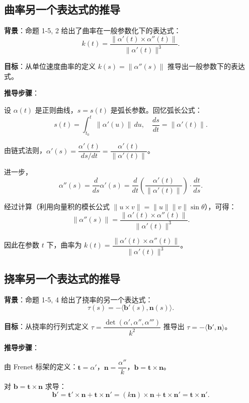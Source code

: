 \subsection*{曲率另一个表达式的推导}\label{sec:appendix-ch1-curvature-alt}

\textbf{背景}：命题 1-5, 2 给出了曲率在一般参数化下的表达式：
\[
k(t) = \frac{\|\alpha'(t) \times \alpha''(t)\|}{\|\alpha'(t)\|^3}.
\]

\textbf{目标}：从单位速度曲率的定义 $k(s) = \|\alpha''(s)\|$ 推导出一般参数下的表达式。

\textbf{推导步骤}：

设 $\alpha(t)$ 是正则曲线，$s = s(t)$ 是弧长参数。回忆弧长公式：
\[
s(t) = \int_{t_0}^t \|\alpha'(u)\| \, du, \quad \frac{ds}{dt} = \|\alpha'(t)\|.
\]

由链式法则，$\alpha'(s) = \dfrac{\alpha'(t)}{ds/dt} = \dfrac{\alpha'(t)}{\|\alpha'(t)\|}$。

进一步，
\[
\alpha''(s) = \frac{d}{ds}\alpha'(s) = \frac{d}{dt}\left(\frac{\alpha'(t)}{\|\alpha'(t)\|}\right) \cdot \frac{dt}{ds}.
\]

经过计算（利用向量积的模长公式 $\|u \times v\| = \|u\|\|v\|\sin\theta$），可得：
\[
\|\alpha''(s)\| = \frac{\|\alpha'(t) \times \alpha''(t)\|}{\|\alpha'(t)\|^3}.
\]

因此在参数 $t$ 下，曲率为 $k(t) = \dfrac{\|\alpha'(t) \times \alpha''(t)\|}{\|\alpha'(t)\|^3}$。

\subsection*{挠率另一个表达式的推导}\label{sec:appendix-ch1-torsion-alt}

\textbf{背景}：命题 1-5, 4 给出了挠率的另一个表达式：
\[
\tau(s) = -\langle \mathbf{b}'(s), \mathbf{n}(s) \rangle.
\]

\textbf{目标}：从挠率的行列式定义 $\tau = \dfrac{\det(\alpha', \alpha'', \alpha''')}{k^2}$ 推导出 $\tau = -\langle \mathbf{b}', \mathbf{n} \rangle$。

\textbf{推导步骤}：

由 Frenet 标架的定义：$\mathbf{t} = \alpha'$，$\mathbf{n} = \dfrac{\alpha''}{k}$，$\mathbf{b} = \mathbf{t} \times \mathbf{n}$。

对 $\mathbf{b} = \mathbf{t} \times \mathbf{n}$ 求导：
\[
\mathbf{b}' = \mathbf{t}' \times \mathbf{n} + \mathbf{t} \times \mathbf{n}' = (k\mathbf{n}) \times \mathbf{n} + \mathbf{t} \times \mathbf{n}' = \mathbf{t} \times \mathbf{n}'.
\]

